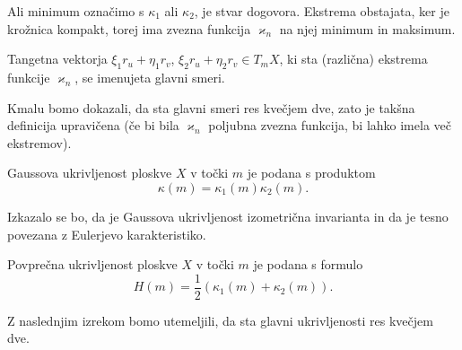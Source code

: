 \begin{opomba}
 Ali minimum označimo s $\kappa_1$ ali $\kappa_2$, je stvar dogovora. Ekstrema obstajata, ker je krožnica kompakt, torej ima zvezna funkcija $\varkappa_n$ na njej minimum in maksimum.
\end{opomba}

\begin{definicija}
\label{def_glavni_smeri}
 Tangetna vektorja $\xi_1 r_u  + \eta_1 r_v$, $\xi_2 r_u  + \eta_2 r_v \in T_mX$, ki sta (različna) ekstrema funkcije $\varkappa_n$, se imenujeta glavni smeri.
\end{definicija}

\begin{opomba}
 Kmalu bomo dokazali, da sta glavni smeri res kvečjem dve, zato je takšna definicija upravičena (če bi bila $\varkappa_n$ poljubna zvezna funkcija, bi lahko imela več ekstremov).
\end{opomba}

\begin{definicija}
\label{def_Gaussova_ukrivljenost}
 Gaussova ukrivljenost ploskve $X$ v točki $m$ je podana s produktom 
 \begin{equation*} \kappa(m) = \kappa_1(m) \kappa_2(m).\end{equation*}
\end{definicija}

\begin{opomba}
 Izkazalo se bo, da je Gaussova ukrivljenost izometrična invarianta in da je tesno povezana z Eulerjevo karakteristiko.
\end{opomba}


\begin{definicija}
\label{def_povprecna_ukrivljenost}
    Povprečna ukrivljenost ploskve $X$ v točki $m$ je podana s formulo 
    \begin{equation*} H(m) = \frac{1}{2} (\kappa_1(m) + \kappa_2(m) ).\end{equation*}
\end{definicija}

Z naslednjim izrekom bomo utemeljili, da sta glavni ukrivljenosti res kvečjem dve. 

